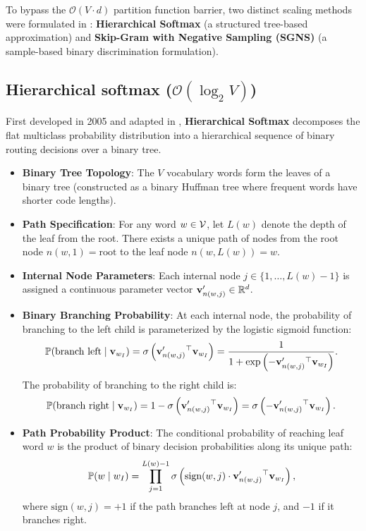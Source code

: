 \documentclass[../../main.tex]{subfiles}
\begin{document}
To bypass the $\mathcal{O}(V \cdot d)$ partition function barrier, two distinct scaling methods were formulated in \cite{mikolov2013distributed}: \textbf{Hierarchical Softmax} (a structured tree-based approximation) and \textbf{Skip-Gram with Negative Sampling (SGNS)} (a sample-based binary discrimination formulation).

\subsection{Hierarchical softmax (\texorpdfstring{$\mathcal{O}(\log_2 V)$}{O(log2 V)})}
\label{subsec:hierarchical_softmax}

First developed in 2005 \cite{morin2005hierarchical} and adapted in \cite{mikolov2013distributed}, \textbf{Hierarchical Softmax} decomposes the flat multiclass probability distribution into a hierarchical sequence of binary routing decisions over a binary tree.

\begin{itemize}
    \item \textbf{Binary Tree Topology}: The $V$ vocabulary words form the leaves of a binary tree (constructed as a binary Huffman tree where frequent words have shorter code lengths).
    \item \textbf{Path Specification}: For any word $w \in \mathcal{V}$, let $L(w)$ denote the depth of the leaf from the root. There exists a unique path of nodes from the root node $n(w, 1) = \text{root}$ to the leaf node $n(w, L(w)) = w$.
    \item \textbf{Internal Node Parameters}: Each internal node $j \in \{1, \dots, L(w)-1\}$ is assigned a continuous parameter vector $\mathbf{v}'_{n(w, j)} \in \mathbb{R}^d$.
    \item \textbf{Binary Branching Probability}: At each internal node, the probability of branching to the left child is parameterized by the logistic sigmoid function:
    \begin{equation}
    \label{eq:hierarchical_branch}
    \mathbb{P}(\text{branch left} \mid \mathbf{v}_{w_I}) = \sigma\left( \mathbf{v}'_{n(w, j)}{}^\top \mathbf{v}_{w_I} \right) = \frac{1}{1 + \exp\left( -\mathbf{v}'_{n(w, j)}{}^\top \mathbf{v}_{w_I} \right)}.
    \end{equation}
    The probability of branching to the right child is:
    \begin{equation}
    \label{eq:hierarchical_right}
    \mathbb{P}(\text{branch right} \mid \mathbf{v}_{w_I}) = 1 - \sigma\left( \mathbf{v}'_{n(w, j)}{}^\top \mathbf{v}_{w_I} \right) = \sigma\left( -\mathbf{v}'_{n(w, j)}{}^\top \mathbf{v}_{w_I} \right).
    \end{equation}
    \item \textbf{Path Probability Product}: The conditional probability of reaching leaf word $w$ is the product of binary decision probabilities along its unique path:
    \begin{equation}
    \label{eq:hierarchical_softmax}
    \mathbb{P}(w \mid w_I) = \prod_{j=1}^{L(w)-1} \sigma\left( \text{sign}(w, j) \cdot \mathbf{v}'_{n(w, j)}{}^\top \mathbf{v}_{w_I} \right),
    \end{equation}
    where $\text{sign}(w, j) = +1$ if the path branches left at node $j$, and $-1$ if it branches right.
\end{itemize}
\end{document}
